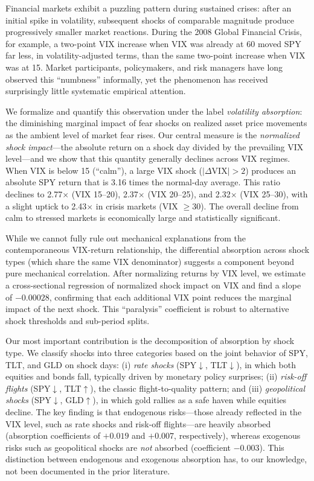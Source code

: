 \documentclass[12pt,a4paper]{article}
\begin{document}
Financial markets exhibit a puzzling pattern during sustained crises: after an initial spike in volatility, subsequent shocks of comparable magnitude produce progressively smaller market reactions. During the 2008 Global Financial Crisis, for example, a two-point VIX increase when VIX was already at 60 moved SPY far less, in volatility-adjusted terms, than the same two-point increase when VIX was at 15. Market participants, policymakers, and risk managers have long observed this ``numbness'' informally, yet the phenomenon has received surprisingly little systematic empirical attention.

We formalize and quantify this observation under the label \textit{volatility absorption}: the diminishing marginal impact of fear shocks on realized asset price movements as the ambient level of market fear rises. Our central measure is the \textit{normalized shock impact}---the absolute return on a shock day divided by the prevailing VIX level---and we show that this quantity generally declines across VIX regimes. When VIX is below 15 (``calm''), a large VIX shock ($|\Delta\text{VIX}| > 2$) produces an absolute SPY return that is 3.16 times the normal-day average. This ratio declines to 2.77$\times$ (VIX 15--20), 2.37$\times$ (VIX 20--25), and 2.32$\times$ (VIX 25--30), with a slight uptick to 2.43$\times$ in crisis markets (VIX $\geq 30$). The overall decline from calm to stressed markets is economically large and statistically significant.

While we cannot fully rule out mechanical explanations from the contemporaneous VIX-return relationship, the differential absorption across shock types (which share the same VIX denominator) suggests a component beyond pure mechanical correlation. After normalizing returns by VIX level, we estimate a cross-sectional regression of normalized shock impact on VIX and find a slope of $-0.00028$, confirming that each additional VIX point reduces the marginal impact of the next shock. This ``paralysis'' coefficient is robust to alternative shock thresholds and sub-period splits.

Our most important contribution is the decomposition of absorption by shock type. We classify shocks into three categories based on the joint behavior of SPY, TLT, and GLD on shock days: (i) \textit{rate shocks} (SPY$\downarrow$, TLT$\downarrow$), in which both equities and bonds fall, typically driven by monetary policy surprises; (ii) \textit{risk-off flights} (SPY$\downarrow$, TLT$\uparrow$), the classic flight-to-quality pattern; and (iii) \textit{geopolitical shocks} (SPY$\downarrow$, GLD$\uparrow$), in which gold rallies as a safe haven while equities decline. The key finding is that endogenous risks---those already reflected in the VIX level, such as rate shocks and risk-off flights---are heavily absorbed (absorption coefficients of $+0.019$ and $+0.007$, respectively), whereas exogenous risks such as geopolitical shocks are \textit{not} absorbed (coefficient $-0.003$). This distinction between endogenous and exogenous absorption has, to our knowledge, not been documented in the prior literature.
\end{document}
